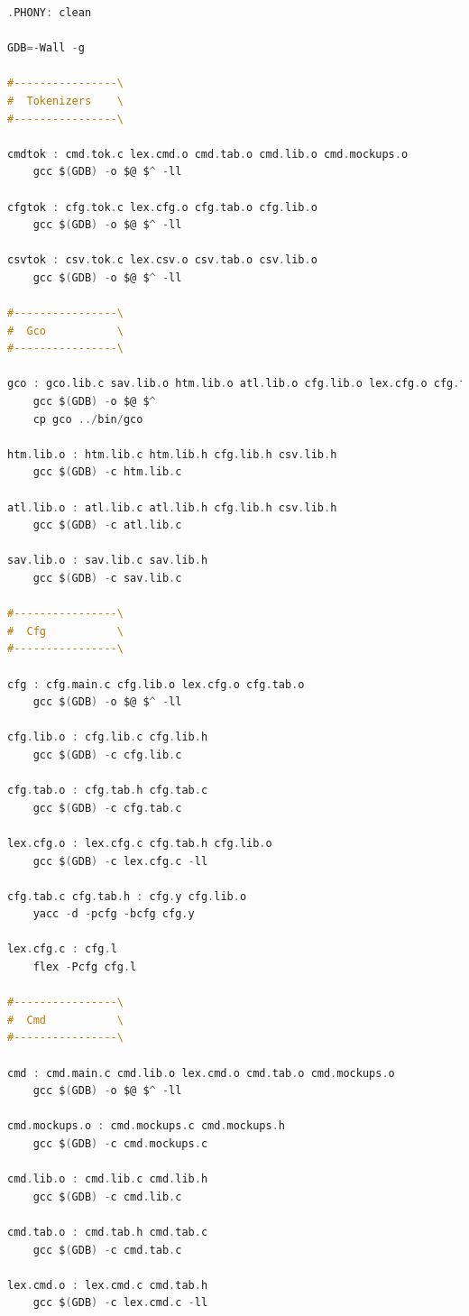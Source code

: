 \documentclass[11pt, a4paper, oneside]{article}
\begin{document}
\begin{lstlisting}[language=C, caption={Makefile}]
.PHONY: clean

GDB=-Wall -g

#----------------\
#  Tokenizers    \
#----------------\

cmdtok : cmd.tok.c lex.cmd.o cmd.tab.o cmd.lib.o cmd.mockups.o
	gcc $(GDB) -o $@ $^ -ll

cfgtok : cfg.tok.c lex.cfg.o cfg.tab.o cfg.lib.o
	gcc $(GDB) -o $@ $^ -ll

csvtok : csv.tok.c lex.csv.o csv.tab.o csv.lib.o
	gcc $(GDB) -o $@ $^ -ll

#----------------\
#  Gco           \
#----------------\

gco : gco.lib.c sav.lib.o htm.lib.o atl.lib.o cfg.lib.o lex.cfg.o cfg.tab.o cmd.lib.o lex.cmd.o cmd.tab.o csv.lib.o lex.csv.o csv.tab.o
	gcc $(GDB) -o $@ $^
	cp gco ../bin/gco

htm.lib.o : htm.lib.c htm.lib.h cfg.lib.h csv.lib.h
	gcc $(GDB) -c htm.lib.c

atl.lib.o : atl.lib.c atl.lib.h cfg.lib.h csv.lib.h
	gcc $(GDB) -c atl.lib.c

sav.lib.o : sav.lib.c sav.lib.h
	gcc $(GDB) -c sav.lib.c

#----------------\
#  Cfg           \
#----------------\

cfg : cfg.main.c cfg.lib.o lex.cfg.o cfg.tab.o
	gcc $(GDB) -o $@ $^ -ll

cfg.lib.o : cfg.lib.c cfg.lib.h
	gcc $(GDB) -c cfg.lib.c

cfg.tab.o : cfg.tab.h cfg.tab.c
	gcc $(GDB) -c cfg.tab.c

lex.cfg.o : lex.cfg.c cfg.tab.h cfg.lib.o
	gcc $(GDB) -c lex.cfg.c -ll

cfg.tab.c cfg.tab.h : cfg.y cfg.lib.o
	yacc -d -pcfg -bcfg cfg.y

lex.cfg.c : cfg.l
	flex -Pcfg cfg.l

#----------------\
#  Cmd           \
#----------------\

cmd : cmd.main.c cmd.lib.o lex.cmd.o cmd.tab.o cmd.mockups.o
	gcc $(GDB) -o $@ $^ -ll

cmd.mockups.o : cmd.mockups.c cmd.mockups.h
	gcc $(GDB) -c cmd.mockups.c

cmd.lib.o : cmd.lib.c cmd.lib.h
	gcc $(GDB) -c cmd.lib.c

cmd.tab.o : cmd.tab.h cmd.tab.c
	gcc $(GDB) -c cmd.tab.c

lex.cmd.o : lex.cmd.c cmd.tab.h
	gcc $(GDB) -c lex.cmd.c -ll


\end{lstlisting}
\end{document}
